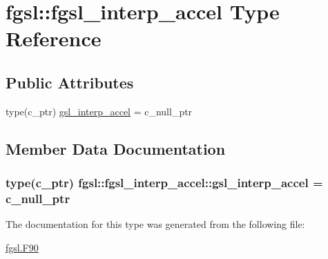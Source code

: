 \hypertarget{structfgsl_1_1fgsl__interp__accel}{}\section{fgsl\+:\+:fgsl\+\_\+interp\+\_\+accel Type Reference}
\label{structfgsl_1_1fgsl__interp__accel}
\subsection*{Public Attributes}
\begin{DoxyCompactItemize}
\item 
type(c\+\_\+ptr) \hyperlink{structfgsl_1_1fgsl__interp__accel_a702c4cc18edadec004fc9549b03afb32}{gsl\+\_\+interp\+\_\+accel} = c\+\_\+null\+\_\+ptr
\end{DoxyCompactItemize}


\subsection{Member Data Documentation}
\hypertarget{structfgsl_1_1fgsl__interp__accel_a702c4cc18edadec004fc9549b03afb32}{}
\subsubsection[{gsl\+\_\+interp\+\_\+accel}]{\setlength{\rightskip}{0pt plus 5cm}type(c\+\_\+ptr) fgsl\+::fgsl\+\_\+interp\+\_\+accel\+::gsl\+\_\+interp\+\_\+accel = c\+\_\+null\+\_\+ptr}\label{structfgsl_1_1fgsl__interp__accel_a702c4cc18edadec004fc9549b03afb32}


The documentation for this type was generated from the following file\+:\begin{DoxyCompactItemize}
\item 
\hyperlink{fgsl_8F90}{fgsl.\+F90}\end{DoxyCompactItemize}
